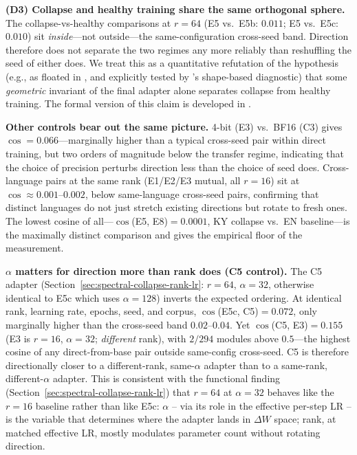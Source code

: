 \documentclass[11pt]{article}
\begin{document}
\textbf{(D3) Collapse and healthy training share the same orthogonal sphere.} The collapse-vs-healthy comparisons at $r{=}64$ (E5 vs.\ E5b: $0.011$; E5 vs.\ E5c: $0.010$) sit \emph{inside}---not outside---the same-configuration cross-seed band. Direction therefore does not separate the two regimes any more reliably than reshuffling the seed of either does. We treat this as a quantitative refutation of the hypothesis (e.g., as floated in , and explicitly tested by \citealp{biderman2024lora}'s shape-based diagnostic) that some \emph{geometric} invariant of the final adapter alone separates collapse from healthy training. The formal version of this claim is developed in .

\textbf{Other controls bear out the same picture.} 4-bit (E3) vs.\ BF16 (C3) gives $\cos=0.066$---marginally higher than a typical cross-seed pair within direct training, but two orders of magnitude below the transfer regime, indicating that the choice of precision perturbs direction less than the choice of seed does. Cross-language pairs at the same rank (E1/E2/E3 mutual, all $r{=}16$) sit at $\cos\approx 0.001$--$0.002$, below same-language cross-seed pairs, confirming that distinct languages do not just stretch existing directions but rotate to fresh ones. The lowest cosine of all---$\cos$(E5, E8)$=0.0001$, KY collapse vs.\ EN baseline---is the maximally distinct comparison and gives the empirical floor of the measurement.

\textbf{$\alpha$ matters for direction more than rank does (C5 control).} The C5 adapter (Section~\ref{sec:spectral-collapse-rank-lr}: $r{=}64$, $\alpha{=}32$, otherwise identical to E5c which uses $\alpha{=}128$) inverts the expected ordering. At identical rank, learning rate, epochs, seed, and corpus, $\cos$(E5c, C5)$=0.072$, only marginally higher than the cross-seed band $0.02$--$0.04$. Yet $\cos$(C5, E3)$=0.155$ (E3 is $r{=}16$, $\alpha{=}32$; \emph{different} rank), with $2/294$ modules above $0.5$---the highest cosine of any direct-from-base pair outside same-config cross-seed. C5 is therefore directionally closer to a different-rank, same-$\alpha$ adapter than to a same-rank, different-$\alpha$ adapter. This is consistent with the functional finding (Section~\ref{sec:spectral-collapse-rank-lr}) that $r{=}64$ at $\alpha{=}32$ behaves like the $r{=}16$ baseline rather than like E5c: $\alpha$ -- via its role in the effective per-step LR -- is the variable that determines where the adapter lands in $\Delta W$ space; rank, at matched effective LR, mostly modulates parameter count without rotating direction.
\end{document}
